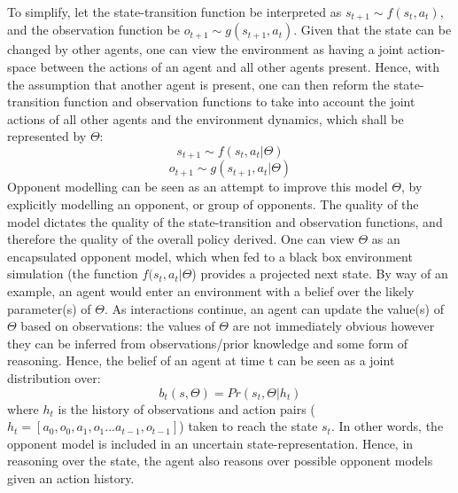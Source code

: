 \newline \newline
To simplify, let the state-transition function be interpreted as $s_{t+1} \sim f(s_t,a_t)$, and the observation function be $o_{t+1} \sim g(s_{t+1}, a_t)$. 
\newline \newline
Given that the state can be changed by other agents, one can view the environment as having a joint action-space between the actions of an agent and all other agents present. Hence, with the assumption that another agent is present, one can then reform the state-transition function and observation functions to take into account the joint actions of all other agents and the environment dynamics, which shall be represented by $\Theta$: 
\begin{equation}
    s_{t+1} \sim f(s_t, a_t|\Theta) 
\end{equation}
\begin{equation}
    o_{t+1} \sim g(s_{t+1}, a_t|\Theta) 
\end{equation}
\newline \newline
Opponent modelling can be seen as an attempt to improve this model $\Theta$, by explicitly modelling an opponent, or group of opponents. 
The quality of the model dictates the quality of the state-transition and observation functions, and therefore the quality of the overall policy derived. 
\newline \newline
One can view $\Theta$ as an encapsulated opponent model, which when fed to a black box environment simulation (the function $ f(s_t, a_t|\Theta$) provides a projected next state.
\newline \newline
By way of an example, an agent would enter an environment with a belief over the likely parameter(s) of $\Theta$. As interactions continue, an agent can update the value(s) of $\Theta$ based on observations: the values of $\Theta$ are not immediately obvious however they can be inferred from observations/prior knowledge and some form of reasoning. Hence, the belief of an agent at time t can be seen as a joint distribution over:
\begin{equation}
    b_t(s,\Theta) = Pr(s_t,\Theta | h_t)
\end{equation}
where $h_t$ is the history of observations and action pairs ($h_t = [a_0, o_0, a_1, o_1 ... a_{t-1}, o_{t-1}]$) taken to reach the state $s_t$. In other words, the opponent model is included in an uncertain state-representation. Hence, in reasoning over the state, the agent also reasons over possible opponent models given an action history. 

